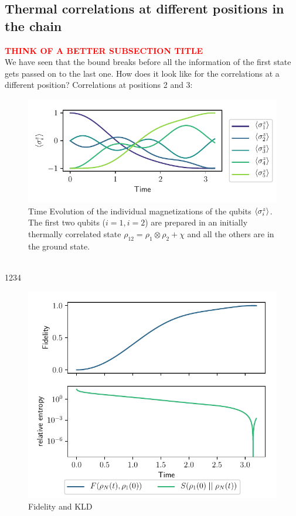 \documentclass{book}
\numberwithin{equation}{section} %
\begin{document}
\subsection{Thermal correlations at different positions in the chain}
\textcolor{red}{\textbf{THINK OF A BETTER SUBSECTION TITLE}}\\
We have seen that the bound breaks before all the information of the first state gets passed on to the last one.
How does it look like for the correlations at a different position?
Correlations at positions 2 and 3:
\begin{figure}[h!]
    \centering
    \includegraphics{alltheplots/corr_at_diff_pos-new-alpha/23_expval_z.pdf}
    \caption{Time Evolution of the individual magnetizations of the qubits
    $\expval{\sigma^z_i}$.
    The first two qubits ($i=1, i=2$) are prepared in an initially thermally correlated state $\rho_{12} = \rho_1 \otimes \rho_2 + \chi$
    and all the others are in the ground state.}
    \label{fig:corr23_expval_z}
\end{figure}\\
1234
\begin{figure}[h!]
    \centering
    \includegraphics{alltheplots/corr_at_diff_pos-new-alpha/23_fidelity_kld.pdf}
    \caption{Fidelity and KLD}
    \label{fig:corr23_fid_kld}
\end{figure}\\
\end{document}
